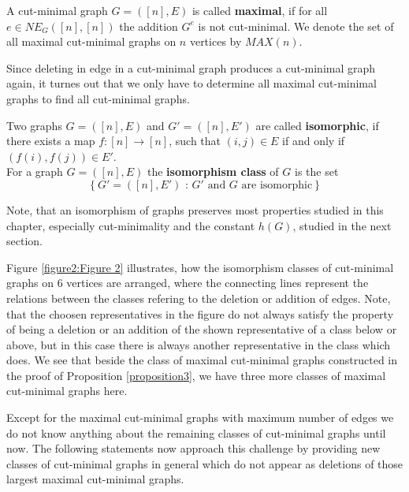 \begin{defi}
A cut-minimal graph \(G=([n],E)\) is called \textbf{maximal}, if for all\\
\(e\in NE_G([n],[n])\) the addition \(G^e\) is not cut-minimal. We denote the set of all maximal cut-minimal graphs on \(n\) vertices by \(MAX(n)\).
\end{defi}
Since deleting in edge in a cut-minimal graph produces a cut-minimal graph again, it turnes out that we only have to determine all maximal cut-minimal graphs to find all cut-minimal graphs.
\begin{defi}
Two graphs \(G=([n],E)\) and \(G'=([n],E')\) are called \textbf{isomorphic}, if there exists a map \(f:[n]\rightarrow [n]\), such that \((i,j)\in E\) if and only if \((f(i),f(j))\in E'\).\\
For a graph \(G=([n],E)\) the \textbf{isomorphism class} of \(G\) is the set
\[
\left\{G'=([n],E')\text{ : }G'\text{ and }G\text{ are isomorphic}\right\}
\]
\end{defi}

\begin{rem}
Note, that an isomorphism of graphs preserves most properties studied in this chapter, especially cut-minimality and the constant \(h(G)\), studied in the next section.
\end{rem}

Figure \ref{figure2:Figure 2} illustrates, how the isomorphism classes of cut-minimal graphs on \(6\) vertices are arranged, where the connecting lines represent the relations between the classes refering to the deletion or addition of edges. Note, that the choosen representatives in the figure do not always satisfy the property of being a deletion or an addition of the shown representative of a class below or above, but in this case there is always another representative in the class which does. We see that beside the class of maximal cut-minimal graphs constructed in the proof of Proposition \ref{proposition3}, we have three more classes of maximal cut-minimal graphs here.



Except for the maximal cut-minimal graphs with maximum number of edges we do not know anything about the remaining classes of cut-minimal graphs until now. The following statements now approach this challenge by providing new classes of cut-minimal graphs in general which do not appear as deletions of those largest maximal cut-minimal graphs.

\newpage

